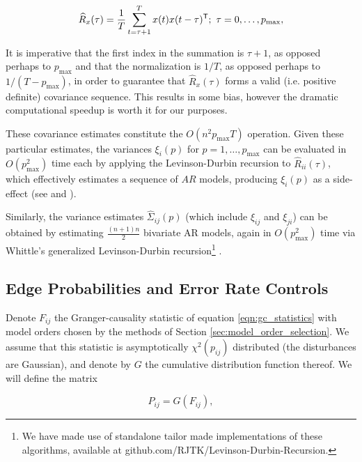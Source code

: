 \documentclass[12pt]{article}
\begin{document}
\begin{equation}
  \label{eqn:covariance_estimate}
  \widehat{R}_x(\tau) = \frac{1}{T}\sum_{t = \tau + 1}^T x(t) x(t - \tau)^{\mathsf{T}};\ \tau = 0, \ldots, p_{\text{max}},
\end{equation}

It is imperative that the first index in the summation is $\tau + 1$, as
opposed perhaps to $p_\text{max}$ and that the normalization is
$1 / T$, as opposed perhaps to $1 / (T - p_\text{max})$, in order to
guarantee that $\widehat{R}_x(\tau)$ forms a valid (i.e. positive
definite) covariance sequence.  This results in some bias, however the
dramatic computational speedup is worth it for our purposes.

These covariance estimates constitute the $O(n^2p_{\text{max}}T)$
operation.  Given these particular estimates, the variances $\xi_i(p)$
for $p = 1, \ldots, p_{\text{max}}$ can be evaluated in
$O(p_{\text{max}}^2)$ time each by applying the Levinson-Durbin
recursion to $\widehat{R}_{ii}(\tau)$, which effectively estimates a
sequence of $AR$ models, producing $\xi_i(p)$ as a side-effect (see
\cite{hayes_statistical_digital_signal_processing} and
\cite{levinson_durbin_recursion}).

Similarly, the variance estimates $\widehat{\Sigma}_{ij}(p)$ (which
include $\xi_{ij}$ and $\xi_{ji}$) can be obtained by estimating
$\frac{(n + 1)n}{2}$ bivariate AR models, again in
$O(p_{\text{max}}^2)$ time via Whittle's generalized Levinson-Durbin
recursion\footnote{We have made use of standalone tailor made
  implementations of these algorithms, available at
  \textsf{github.com/RJTK/Levinson-Durbin-Recursion}.}
\cite{whittle_generalized_levinson_durbin}.

\subsection{Edge Probabilities and Error Rate Controls}
\label{sec:error_rate_control}
Denote $F_{ij}$ the Granger-causality statistic of equation
\ref{eqn:gc_statistics} with model orders chosen by the methods of
Section \ref{sec:model_order_selection}.  We assume that this
statistic is asymptotically $\chi^2(p_{ij})$ distributed (the
disturbances are Gaussian), and denote by $G$ the cumulative
distribution function thereof.  We will define the matrix

\begin{equation}
  \label{eqn:edge_inclusion_probability}
  P_{ij} = G(F_{ij}),
\end{equation}
\end{document}
